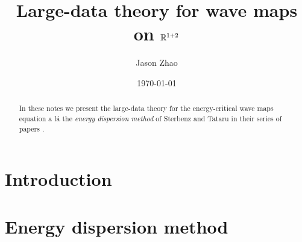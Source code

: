 \documentclass[reqno]{amsart}
\title
{
	Large-data theory for wave maps on $\mathbb R^{1 + 2}$
}
\author{Jason Zhao}
\date{\today}
\begin{document}
\maketitle

\begin{abstract}
	In these notes we present the large-data theory for the energy-critical wave maps equation a l\'a the \textit{energy dispersion method} of Sterbenz and Tataru in their series of papers	\cite{SterbenzTataru2010, SterbenzTataru2010a}. 
\end{abstract}

\tableofcontents

\section{Introduction}


\section{Energy dispersion method}




\end{document}
